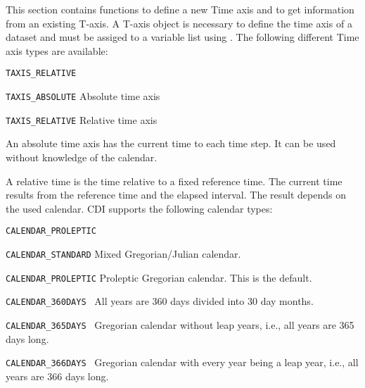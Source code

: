 This section contains functions to define a new Time axis
and to get information from an existing T-axis.
A T-axis  object is necessary to define the time axis of a dataset
and must be assiged to a variable list using .
The following different Time axis types are available:

\vspace*{3mm}
\hspace*{8mm}\begin{minipage}{15cm}
\begin{deflist}{\large\texttt{TAXIS\_RELATIVE \ \ }}
\item[\large\texttt{TAXIS\_ABSOLUTE}]  Absolute time axis    
\item[\large\texttt{TAXIS\_RELATIVE}]  Relative time axis
\end{deflist}
\end{minipage}
\vspace*{3mm}

An absolute time axis has the current time to each time step.
It can be used without knowledge of the calendar.

A relative time is the time relative to a fixed reference time.
The current time results from the reference time and the elapsed interval.
The result depends on the used calendar.
CDI supports the following calendar types:

\vspace*{3mm}
\hspace*{8mm}\begin{minipage}{15cm}
\begin{deflist}{\large\texttt{CALENDAR\_PROLEPTIC \ \ }}
\item[\large\texttt{CALENDAR\_STANDARD}]  Mixed Gregorian/Julian calendar.
\item[\large\texttt{CALENDAR\_PROLEPTIC}]  Proleptic Gregorian calendar. This is the default.
\item[\large\texttt{CALENDAR\_360DAYS }]  All years are 360 days divided into 30 day months.
\item[\large\texttt{CALENDAR\_365DAYS }]  Gregorian calendar without leap years, i.e., all years are 365 days long.
\item[\large\texttt{CALENDAR\_366DAYS }]  Gregorian calendar with every year being a leap year, i.e., all years are 366 days long.
\end{deflist}
\end{minipage}
